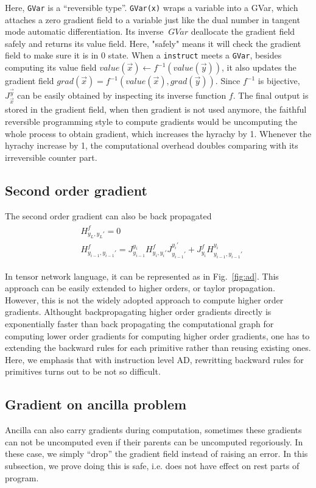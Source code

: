 \documentclass[aps,twocolumn,longbibliography,english,superscriptaddress,prr]{revtex4-1}
\newcommand{\<}{\langle}
\renewcommand{\>}{\rangle}
\newcommand{\vx}{{\vec x}}
\newcommand{\vy}{{\vec y}}
\newcommand{\Fig}[1]{Fig.~\ref{#1}}
\theoremstyle{definition}\newtheorem{definition}{\textit{Definition}}
\begin{document}
Here, \texttt{GVar} is a ``reversible type''. \texttt{GVar(x)} wraps a variable into a GVar, which attaches a zero gradient field to a variable just like the dual number in tangent mode automatic differentiation. Its inverse $~GVar$ deallocate the gradient field safely and returns its value field. Here, "safely" means it will check the gradient field to make sure it is in $0$ state.
When a \texttt{instruct} meets a \texttt{GVar}, besides computing its value field $value(\vx) \leftarrow f^{-1}(value(\vy))$, it also updates the gradient field $grad(\vx) = f^{-1}(value(\vx), grad(\vy))$. Since $f^{-1}$ is bijective, $J^\vy_\vx$ can be easily obtained by inspecting its inverse function $f$.
The final output is stored in the gradient field, when then gradient is not used anymore, the faithful reversible programming style to compute gradients would be uncomputing the whole process to obtain gradient, which increases the hyrachy by 1. Whenever the hyrachy increase by 1, the computational overhead doubles comparing with its irreversible counter part.

\subsection{Second order gradient}
The second order gradient can also be back propagated
\begin{align}
    \begin{split}
        &H^f_{y_L,y_L'} = 0\\
        &H^f_{y_{i-1},y_{i-1}'} = J^{y_i}_{y_{i-1}} H^f_{y_i, y_i'} J^{y_i'}_{y_{i-1}'} + J^f_{y_i} H^{y_i}_{y_{i-1}, y_{i-1}'}
    \end{split}
\end{align}

In tensor network language, it can be represented as in \Fig{fig:ad}.
This approach can be easily extended to higher orders, or taylor propagation.
However, this is not the widely adopted approach to compute higher order gradients.
Althought backpropagating higher order gradients directly is exponentially faster than back propagating the computational graph for computing lower order gradients for computing higher order gradients, one has to extending the backward rules for each primitive rather than reusing existing ones.
Here, we emphasis that with instruction level AD, rewritting backward rules for primitives turns out to be not so difficult.

\subsection{Gradient on ancilla problem}
Ancilla can also carry gradients during computation, sometimes these gradients can not be uncomputed even if their parents can be uncomputed regoriously. In these case, we simply ``drop'' the gradient field instead of raising an error. In this subsection, we prove doing this is safe, i.e. does not have effect on rest parts of program.
\end{document}
